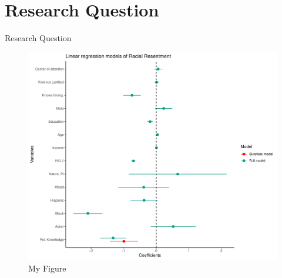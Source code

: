 \documentclass[bigger]{beamer}
\begin{document}
\section{Research Question}
\begin{frame}{Research Question}

\begin{figure}[htbp]
    \centering
        \caption{My Figure}
    \includegraphics[width=0.7\linewidth]{../manuscript/figures/ols_coefficient_1.pdf}
\end{figure}
\end{frame}
\end{document}
